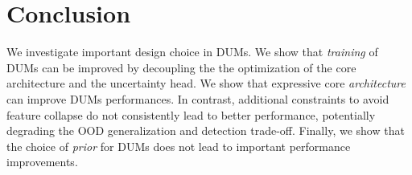 \section{Conclusion}

We investigate important design choice in DUMs. We show that \emph{training} of DUMs can be improved by decoupling the the optimization of the core architecture and the uncertainty head. We show that expressive core \emph{architecture} can improve DUMs performances. In contrast, additional constraints to avoid feature collapse do not consistently lead to better performance, potentially degrading the OOD generalization and detection trade-off. Finally, we show that the choice of \emph{prior} for DUMs does not lead to important performance improvements.
